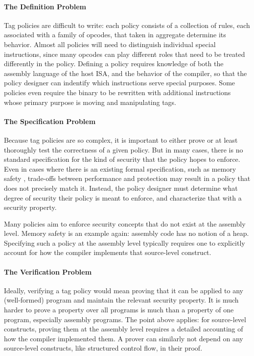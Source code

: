 \documentclass{report}
\begin{document}
\paragraph{The Definition Problem}

Tag policies are difficult to write:
each policy consists of a collection of rules, each associated with a family of opcodes,
that taken in aggregate determine its behavior. Almost all policies will need to distinguish
individual special instructions, since many opcodes can play different roles that need to be
treated differently in the policy. Defining a policy requires knowledge of both the assembly
language of the host ISA, and the behavior of the compiler, so that the policy designer can
indentify which instructions serve special purposes. Some policies even require the binary
to be rewritten with additional instructions whose primary purpose is moving and manipulating
tags.

\paragraph{The Specification Problem}

Because tag policies are so complex, it is important to either prove or
at least thoroughly test the correctness of a given policy. But in many cases, there is no
standard specification for the kind of security that the policy hopes to enforce.
Even in cases where there is an existing formal specification, such as memory safety \cite{Azevedo+16},
trade-offs between performance and protection may result in a policy that does not precisely match it.
Instead, the policy designer must determine what degree of security their policy is meant to enforce,
and characterize that with a security property.

Many policies aim to enforce security concepts that do not exist at the assembly level. Memory safety
is an example again: assembly code has no notion of a heap. Specifying such a policy at the assembly
level typically requires one to explicitly account for how the compiler implements that source-level
construct.

\paragraph{The Verification Problem}

Ideally, verifying a tag policy would mean proving that it can be applied to any (well-formed)
program and maintain the relevant security property. It is much harder to prove a property over all
programs is much than a property of one program, especially assembly programs. The point above applies:
for source-level constructs, proving them at the assembly level requires a detailed accounting of 
how the compiler implemented them. A prover can similarly not depend on any source-level constructs,
like structured control flow, in their proof.
\end{document}
